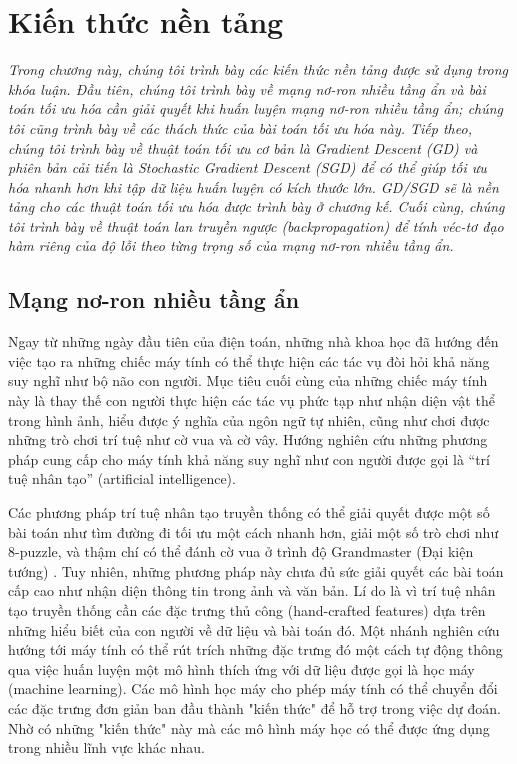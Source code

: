 \chapter{Kiến thức nền tảng}
\label{Chapter2}

\textit{Trong chương này, chúng tôi trình bày các kiến thức nền tảng được sử dụng trong khóa luận. Đầu tiên, chúng tôi trình bày về mạng nơ-ron nhiều tầng ẩn và bài toán tối ưu hóa cần giải quyết khi huấn luyện mạng nơ-ron nhiều tầng ẩn; chúng tôi cũng trình bày về các thách thức của bài toán tối ưu hóa này. Tiếp theo, chúng tôi trình bày về thuật toán tối ưu cơ bản là Gradient Descent (GD) và phiên bản cải tiến là Stochastic Gradient Descent (SGD) để có thể giúp tối ưu hóa nhanh hơn khi tập dữ liệu huấn luyện có kích thước lớn. GD/SGD sẽ là nền tảng cho các thuật toán tối ưu hóa được trình bày ở chương kế. Cuối cùng, chúng tôi trình bày về thuật toán lan truyền ngược (backpropagation) để tính véc-tơ đạo hàm riêng của độ lỗi theo từng trọng số của mạng nơ-ron nhiều tầng ẩn.}

\section{Mạng nơ-ron nhiều tầng ẩn}

Ngay từ những ngày đầu tiên của điện toán, những nhà khoa học đã hướng đến việc tạo ra những chiếc máy tính có thể thực hiện các tác vụ đòi hỏi khả năng suy nghĩ như bộ não con người. Mục tiêu cuối cùng của những chiếc máy tính này là thay thế con người thực hiện các tác vụ phức tạp như nhận diện vật thể trong hình ảnh, hiểu được ý nghĩa của ngôn ngữ tự nhiên, cũng như chơi được những trò chơi trí tuệ như cờ vua và cờ vây. Hướng nghiên cứu những phương pháp cung cấp cho máy tính khả năng suy nghĩ như con người được gọi là ``trí tuệ nhân tạo'' (artificial intelligence).

Các phương pháp trí tuệ nhân tạo truyền thống có thể giải quyết được một số bài toán như tìm đường đi tối ưu một cách nhanh hơn, giải một số trò chơi như 8-puzzle, và thậm chí có thể đánh cờ vua ở trình độ Grandmaster (Đại kiện tướng) \cite{campbell2001deepblue}. Tuy nhiên, những phương pháp này chưa đủ sức giải quyết các bài toán cấp cao như nhận diện thông tin trong ảnh và văn bản. Lí do là vì trí tuệ nhân tạo truyền thống cần các đặc trưng thủ công (hand-crafted features) dựa trên những hiểu biết của con người về dữ liệu và bài toán đó. Một nhánh nghiên cứu hướng tới máy tính có thể rút trích những đặc trưng đó một cách tự động thông qua việc huấn luyện một mô hình thích ứng với dữ liệu được gọi là học máy (machine learning). Các mô hình học máy cho phép máy tính có thể chuyển đổi các đặc trưng đơn giản ban đầu thành "kiến thức" để hỗ trợ trong việc dự đoán. Nhờ có những "kiến thức" này mà các mô hình máy học có thể được ứng dụng trong nhiều lĩnh vực khác nhau.

